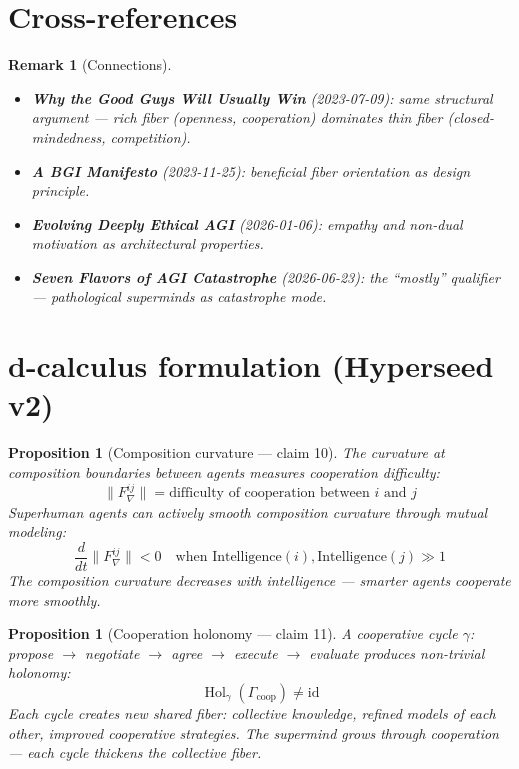 \documentclass[11pt,a4paper]{article}
\newtheorem{proposition}[definition]{Proposition}
\newtheorem{remark}[definition]{Remark}
\begin{document}
\section{Cross-references}

\begin{remark}[Connections]
\begin{itemize}
\item \textbf{Why the Good Guys Will Usually Win} (2023-07-09): same
  structural argument --- rich fiber (openness, cooperation) dominates
  thin fiber (closed-mindedness, competition).
\item \textbf{A BGI Manifesto} (2023-11-25): beneficial fiber orientation
  as design principle.
\item \textbf{Evolving Deeply Ethical AGI} (2026-01-06): empathy and
  non-dual motivation as architectural properties.
\item \textbf{Seven Flavors of AGI Catastrophe} (2026-06-23): the
  ``mostly'' qualifier --- pathological superminds as catastrophe mode.
\end{itemize}
\end{remark}

\section{d-calculus formulation (Hyperseed v2)}

\begin{proposition}[Composition curvature --- claim 10]
\label{prop:curvature}
The curvature at composition boundaries between agents measures
cooperation difficulty:
\[
  \|F_\nabla^{ij}\| = \text{difficulty of cooperation between } i
    \text{ and } j
\]
Superhuman agents can actively smooth composition curvature through
mutual modeling:
\[
  \frac{d}{dt}\|F_\nabla^{ij}\| < 0 \quad \text{when }
    \text{Intelligence}(i), \text{Intelligence}(j) \gg 1
\]
The composition curvature decreases with intelligence --- smarter agents
cooperate more smoothly.
\end{proposition}

\begin{proposition}[Cooperation holonomy --- claim 11]
\label{prop:holonomy}
A cooperative cycle $\gamma$: propose $\to$ negotiate $\to$ agree $\to$
execute $\to$ evaluate produces non-trivial holonomy:
\[
  \operatorname{Hol}_\gamma(\Gamma_{\text{coop}}) \neq \mathrm{id}
\]
Each cycle creates new shared fiber: collective knowledge, refined models
of each other, improved cooperative strategies. The supermind grows
through cooperation --- each cycle thickens the collective fiber.
\end{proposition}
\end{document}
